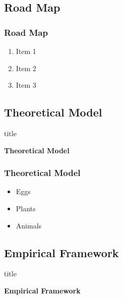 \documentclass[11pt]{beamer}
\begin{document}
\begin{frame}
	\section{Road Map}
	\frametitle{\bfseries Road Map}\label{map}
	
	\begin{enumerate}
		\item Item 1
		\item Item 2
		\item Item 3
	\end{enumerate}
\end{frame}

\begin{frame}
	\section[Theoretical]{Theoretical Model}
	
	\begin{beamercolorbox}{title}
		\begin{center}
			\bfseries \huge Theoretical Model
		\end{center}
	\end{beamercolorbox}

\end{frame}

\begin{frame}
	\frametitle{\bfseries Theoretical Model}

		\begin{itemize}
			\item<1-> Eggs
			\item<2-> Plants
			\item<3-> Animals
		\end{itemize}

	
\end{frame}
\begin{frame}
	\section[Framework]{Empirical Framework}
	
	\begin{beamercolorbox}{title}
		\begin{center}
			\bfseries \huge Empirical Framework
		\end{center}	
	\end{beamercolorbox}
	
\end{frame}
\end{document}
